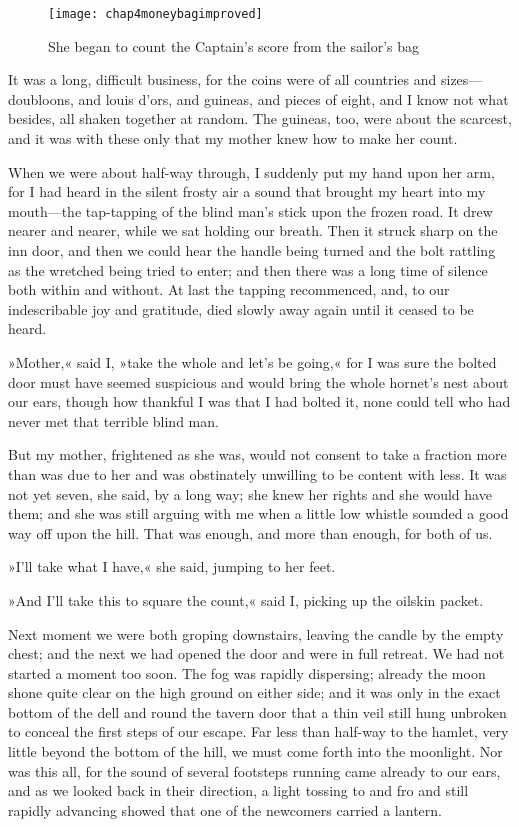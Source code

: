 \begin{figure}[p]
\centering
\texttt{[image: chap4moneybagimproved]}
\caption[She began to count the Captain's score]{She began to count the Captain's score from the sailor's bag}
\end{figure}

It was a long, difficult business, for the coins were of all countries and sizes—doubloons, and louis d'ors, and guineas, and pieces of eight, and I know not what besides, all shaken together at random. The guineas, too, were about the scarcest, and it was with these only that my mother knew how to make her count.

When we were about half-way through, I suddenly put my hand upon her arm, for I had heard in the silent frosty air a sound that brought my heart into my mouth—the tap-tapping of the blind man's stick upon the frozen road. It drew nearer and nearer, while we sat holding our breath. Then it struck sharp on the inn door, and then we could hear the handle being turned and the bolt rattling as the wretched being tried to enter; and then there was a long time of silence both within and without. At last the tapping recommenced, and, to our indescribable joy and gratitude, died slowly away again until it ceased to be heard.

»Mother,« said I, »take the whole and let's be going,« for I was sure the bolted door must have seemed suspicious and would bring the whole hornet's nest about our ears, though how thankful I was that I had bolted it, none could tell who had never met that terrible blind man.

But my mother, frightened as she was, would not consent to take a fraction more than was due to her and was obstinately unwilling to be content with less. It was not yet seven, she said, by a long way; she knew her rights and she would have them; and she was still arguing with me when a little low whistle sounded a good way off upon the hill. That was enough, and more than enough, for both of us.

»I'll take what I have,« she said, jumping to her feet.

»And I'll take this to square the count,« said I, picking up the oilskin packet.

Next moment we were both groping downstairs, leaving the candle by the empty chest; and the next we had opened the door and were in full retreat. We had not started a moment too soon. The fog was rapidly dispersing; already the moon shone quite clear on the high ground on either side; and it was only in the exact bottom of the dell and round the tavern door that a thin veil still hung unbroken to conceal the first steps of our escape. Far less than half-way to the hamlet, very little beyond the bottom of the hill, we must come forth into the moonlight. Nor was this all, for the sound of several footsteps running came already to our ears, and as we looked back in their direction, a light tossing to and fro and still rapidly advancing showed that one of the newcomers carried a lantern.

